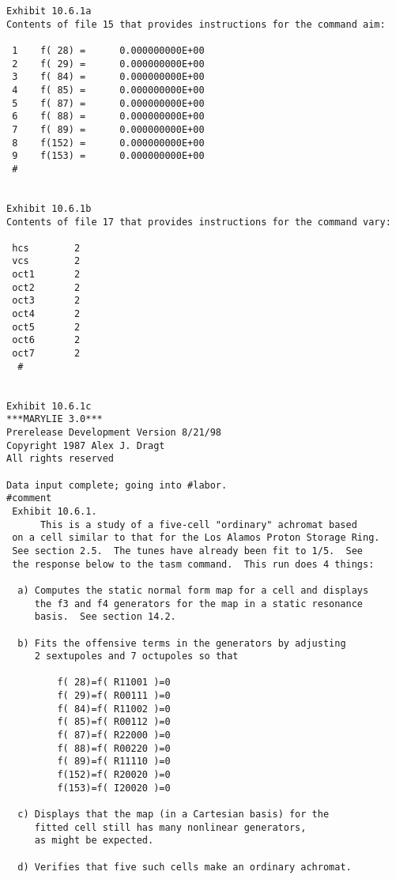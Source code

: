 \begin{footnotesize}
\begin{verbatim}
Exhibit 10.6.1a
Contents of file 15 that provides instructions for the command aim:

 1    f( 28) =      0.000000000E+00
 2    f( 29) =      0.000000000E+00
 3    f( 84) =      0.000000000E+00
 4    f( 85) =      0.000000000E+00
 5    f( 87) =      0.000000000E+00
 6    f( 88) =      0.000000000E+00
 7    f( 89) =      0.000000000E+00
 8    f(152) =      0.000000000E+00
 9    f(153) =      0.000000000E+00
 #


Exhibit 10.6.1b
Contents of file 17 that provides instructions for the command vary:

 hcs        2
 vcs        2
 oct1       2
 oct2       2
 oct3       2
 oct4       2
 oct5       2
 oct6       2
 oct7       2
  #


Exhibit 10.6.1c
***MARYLIE 3.0***
Prerelease Development Version 8/21/98
Copyright 1987 Alex J. Dragt
All rights reserved

Data input complete; going into #labor.
#comment
 Exhibit 10.6.1.
      This is a study of a five-cell "ordinary" achromat based
 on a cell similar to that for the Los Alamos Proton Storage Ring.
 See section 2.5.  The tunes have already been fit to 1/5.  See
 the response below to the tasm command.  This run does 4 things:

  a) Computes the static normal form map for a cell and displays
     the f3 and f4 generators for the map in a static resonance
     basis.  See section 14.2.

  b) Fits the offensive terms in the generators by adjusting
     2 sextupoles and 7 octupoles so that

         f( 28)=f( R11001 )=0
         f( 29)=f( R00111 )=0
         f( 84)=f( R11002 )=0
         f( 85)=f( R00112 )=0
         f( 87)=f( R22000 )=0
         f( 88)=f( R00220 )=0
         f( 89)=f( R11110 )=0
         f(152)=f( R20020 )=0
         f(153)=f( I20020 )=0

  c) Displays that the map (in a Cartesian basis) for the
     fitted cell still has many nonlinear generators,
     as might be expected.

  d) Verifies that five such cells make an ordinary achromat.


\end{verbatim}
\end{footnotesize}
